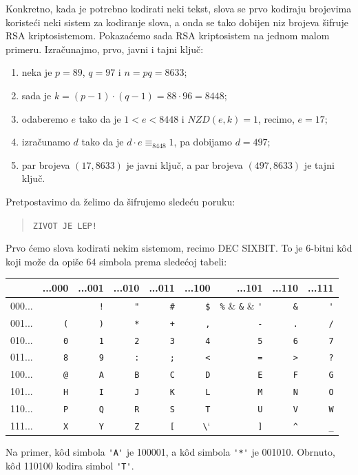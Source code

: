   Konkretno, kada je potrebno kodirati neki tekst, slova se prvo kodiraju brojevima koriste\'ci neki sistem za kodiranje
  slova, a onda se tako dobijen niz brojeva \v sifruje RSA kriptosistemom. Pokaza\'cemo sada RSA kriptosistem na jednom malom
  primeru. Izra\v cunajmo, prvo, javni i tajni klju\v c:
  \begin{enumerate}\itemsep -1.5pt
  \item neka je $p = 89$, $q = 97$ i $n = pq = 8633$;
  \item sada je $k = (p-1)\cdot(q-1) = 88 \cdot 96 = 8448$;
  \item odaberemo $e$ tako da je $1 < e < 8448$ i $\mathit{NZD}(e, k) = 1$, recimo, $e = 17$;
  \item izra\v cunamo $d$ tako da je $d \cdot e \equiv_{8448} 1$, pa dobijamo $d = 497$;
  \item par brojeva $(17, 8633)$ je javni klju\v c, a par brojeva $(497, 8633)$ je tajni klju\v c.
  \end{enumerate}
  Pretpostavimo da \v zelimo da \v sifrujemo slede\'cu poruku:
  \begin{quote}
    \texttt{ZIVOT JE LEP!}
  \end{quote}
  Prvo \'cemo slova kodirati nekim sistemom, recimo DEC SIXBIT.
  To je 6-bitni k\^od koji mo\v ze da opi\v se 64 simbola prema slede\'coj tabeli:
  \begin{center}
    \begin{tabular}{r|rrrrrrrr}
             & ...000    & ...001   & ...010   & ...011   & ...100   & ...101   & ...110   & ...111  \\
      \hline
      000... & \verb*` ` & \verb`!` & \verb`"` & \verb`#` & \verb`$` & \verb`%` & \verb`&` & \verb`'`\\
      001... & \verb`(`  & \verb`)` & \verb`*` & \verb`+` & \verb`,` & \verb`-` & \verb`.` & \verb`/`\\
      010... & \verb`0`  & \verb`1` & \verb`2` & \verb`3` & \verb`4` & \verb`5` & \verb`6` & \verb`7`\\
      011... & \verb`8`  & \verb`9` & \verb`:` & \verb`;` & \verb`<` & \verb`=` & \verb`>` & \verb`?`\\
      100... & \verb`@`  & \verb`A` & \verb`B` & \verb`C` & \verb`D` & \verb`E` & \verb`F` & \verb`G`\\
      101... & \verb`H`  & \verb`I` & \verb`J` & \verb`K` & \verb`L` & \verb`M` & \verb`N` & \verb`O`\\
      110... & \verb`P`  & \verb`Q` & \verb`R` & \verb`S` & \verb`T` & \verb`U` & \verb`V` & \verb`W`\\
      111... & \verb`X`  & \verb`Y` & \verb`Z` & \verb`[` & \verb`\` & \verb`]` & \verb`^` & \verb`_`
    \end{tabular}
  \end{center}
  Na primer, k\^od simbola \verb`'A'` je 100001, a k\^od simbola \verb`'*'` je 001010.
  Obrnuto, k\^od 110100 kodira simbol \verb`'T'`.

